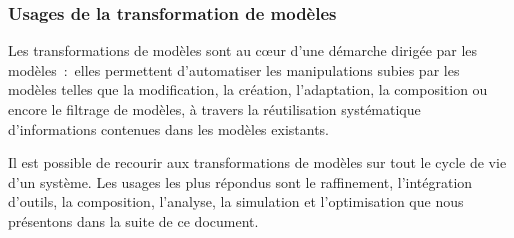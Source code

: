 \subsubsection{Usages de la transformation de modèles }
Les transformations de modèles sont au cœur d'une démarche dirigée par les 
modèles~:~elles permettent d'automatiser les manipulations subies par les 
modèles telles que la modification, la création, l'adaptation, la composition ou 
encore le filtrage de modèles, à travers la réutilisation systématique 
d'informations contenues dans les modèles existants. 

Il est possible de recourir aux transformations de modèles sur tout le cycle de 
vie d'un système. Les usages les plus répondus sont le raffinement, 
l'intégration d'outils, la composition, l'analyse, la simulation et 
l'optimisation que nous présentons dans la suite de ce document. 

